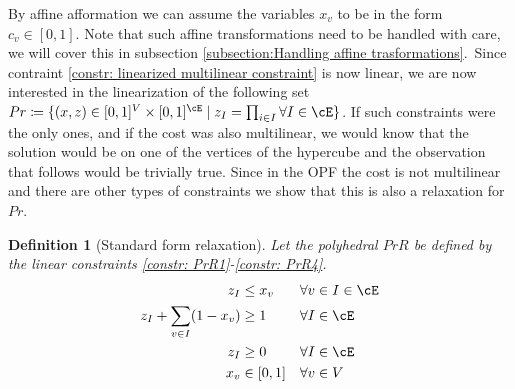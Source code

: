 \documentclass{article}
\newcommand{\gr}[2][]{\todo[color=green!20,#1]{\textsf{G:} #2}}
\newtheorem{definition}{Definition}
\begin{document}
	By affine afformation we can assume the variables \(x_v\) to be in the form \(c_v \in [0,1]\). Note that such affine transformations need to be handled with care, we will cover this in subsection \ref{subsection:Handling affine trasformations}.\
	Since contraint \eqref{constr: linearized multilinear constraint} is now linear, we are now interested in the linearization of the following set \(Pr \coloneqq  \{(x,z) \in [0,1]^V \times [0,1]^{\cE} \mid z_I = \prod_{i \in I} \forall I \in \cE\}\).
	If such constraints were the only ones, and if the cost was also multilinear, we would know that the solution would be on one of the vertices of the hypercube and the observation that follows would be trivially true. Since in the OPF the cost is not multilinear and there are other types of constraints we show that this is also a relaxation for \(Pr\).
	\begin{definition}[Standard form relaxation]\label{def: standard form relaxation}
		Let the polyhedral \(PrR\) be defined by the linear constraints  \eqref{constr: PrR1}-\eqref{constr: PrR4}.
		\gr[]{fixalignment}
		\begin{subequations}
			\begin{align}
				z_I &\leq x_v    && \forall v \in I \in \cE \label{constr: PrR1} \\
				z_I + \sum_{v \in I}(1-x_v) &\geq 1 &&  \forall I \in \cE \label{constr: PrR2}\\
				z_I &\geq 0  && \forall I \in \cE \label{constr: PrR3}\\
				x_v &\in [0,1]  && \forall v \in V \label{constr: PrR4}
			\end{align}
		\end{subequations}
	\end{definition}
\end{document}
